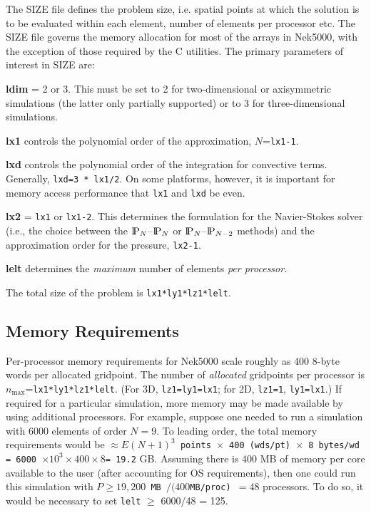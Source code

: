 The SIZE file defines the problem size, i.e. spatial points at which the solution is to be evaluated within each element, number of elements per processor etc.
The SIZE file governs the memory allocation for most of the arrays
in Nek5000, with the exception of those required by the C utilities.
The primary parameters of interest in SIZE are: 
\begin{description}
\item{\bf ldim} = 2 or 3.  This must be set to 2 for
two-dimensional or axisymmetric simulations  (the latter
only partially supported) or to 3 for three-dimensional simulations.
\item{\bf lx1} controls the polynomial order of the approximation,
\(N\)={\tt lx1-1}.
\item{\bf lxd} controls the polynomial order of the integration for
convective terms.  Generally, {\tt lxd=3 * lx1/2}.  On some platforms, however,
it is important for memory access performance that {\tt lx1} and {\tt lxd} be even.
\item{\bf lx2} = {\tt lx1} or {\tt lx1-2}.  This determines the formulation for
the Navier-Stokes solver (i.e., the choice between the \(\PP_N\)--\(\PP_N\) 
or \(\PP_N\)--\(\PP_{N-2}\) methods) and the approximation order for the
pressure, {\tt lx2-1}.
\item{\bf lelt} determines the {\em maximum} number of elements 
{\em per processor}.
\end{description}

The total size of the problem is {\tt lx1*ly1*lz1*lelt}.

\subsection{Memory Requirements}

Per-processor memory requirements for  Nek5000 scale
roughly as 400 8-byte words per allocated gridpoint.  The number
of {\em allocated} gridpoints per processor is 
\(n_{\max}\)={\tt lx1*ly1*lz1*lelt}.  
(For 3D, {\tt lz1=ly1=lx1}; for 2D, {\tt lz1=1}, {\tt ly1=lx1}.)  
If required for a particular simulation, more memory may be made
available by using additional processors.  For example, suppose
one needed to run a simulation with 6000 elements of order \(N=9\).
To leading order, the total memory requirements would be
{\tt \(\approx E(N+1)^3\) points \(\times\) 400 (wds/pt) \(\times\) 8 bytes/wd =
6000 \(\times 10^3 \times 400 \times 8 \)= 19.2} GB.  Assuming there
is 400 MB of memory per core available to the user (after accounting
for OS requirements), then one could run this simulation with
{\tt \(P \ge 19,200\) \mbox{MB} \(/( 400 \)\mbox{MB/proc}) \(= 48\)} processors.
To do so, it would be necessary to set {\tt lelt} \(\ge\) 6000/48 = 125.

